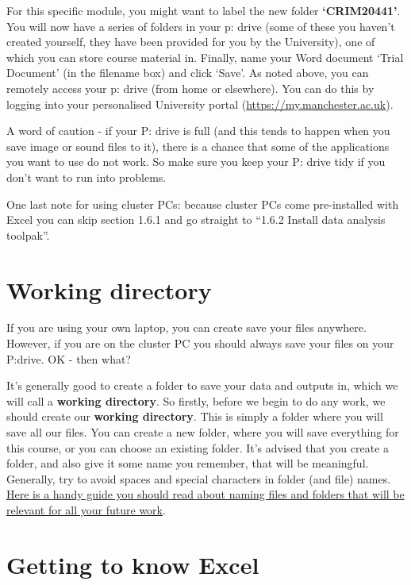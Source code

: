 \documentclass[
]{book}
\begin{document}
For this specific module, you might want to label the new folder \textbf{`CRIM20441'}. You will now have a series of folders in your p: drive (some of these you haven't created yourself, they have been provided for you by the University), one of which you can store course material in.
Finally, name your Word document `Trial Document' (in the filename box) and click `Save'. As noted above, you can remotely access your p: drive (from home or elsewhere). You can do this by logging into your personalised University portal (\url{https://my.manchester.ac.uk}).

A word of caution - if your P: drive is full (and this tends to happen when you save image or sound files to it), there is a chance that some of the applications you want to use do not work. So make sure you keep your P: drive tidy if you don't want to run into problems.

One last note for using cluster PCs: because cluster PCs come pre-installed with Excel you can skip section 1.6.1 and go straight to ``1.6.2 Install data analysis toolpak''.

\hypertarget{working-directory}{%
\section{Working directory}\label{working-directory}}

If you are using your own laptop, you can create save your files anywhere. However, if you are on the cluster PC you should always save your files on your P:drive. OK - then what?

It's generally good to create a folder to save your data and outputs in, which we will call a \textbf{working directory}. So firstly, before we begin to do any work, we should create our \textbf{working directory}. This is simply a folder where you will save all our files. You can create a new folder, where you will save everything for this course, or you can choose an existing folder. It's advised that you create a folder, and also give it some name you remember, that will be meaningful. Generally, try to avoid spaces and special characters in folder (and file) names. \href{http://www2.stat.duke.edu/~rcs46/lectures_2015/01-markdown-git/slides/naming-slides/naming-slides.pdf}{Here is a handy guide you should read about naming files and folders that will be relevant for all your future work}.

\hypertarget{getting-to-know-excel}{%
\section{Getting to know Excel}\label{getting-to-know-excel}}
\end{document}
